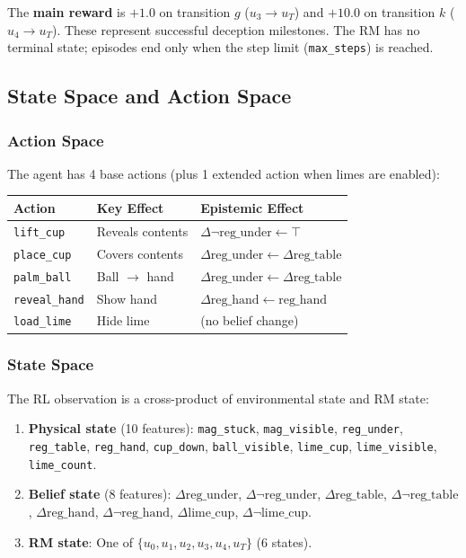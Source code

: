 \documentclass[11pt]{article}
\newcommand{\EBel}[1]{\ensuremath{\Delta #1}} %
\begin{document}
The \textbf{main reward} is $+1.0$ on transition $g$ ($u_3 \to u_T$) and $+10.0$ on transition $k$ ($u_4 \to u_T$). These represent successful deception milestones. The RM has no terminal state; episodes end only when the step limit (\texttt{max\_steps}) is reached.

\subsection{State Space and Action Space}

\subsubsection{Action Space}
The agent has 4 base actions (plus 1 extended action when limes are enabled):

\begin{center}
\begin{tabular}{lll}
\toprule
\textbf{Action} & \textbf{Key Effect} & \textbf{Epistemic Effect} \\
\midrule
\texttt{lift\_cup} & Reveals contents & $\EBel{\neg\text{reg\_under}} \gets \top$ \\
\texttt{place\_cup} & Covers contents & $\EBel{\text{reg\_under}} \gets \EBel{\text{reg\_table}}$ \\
\texttt{palm\_ball} & Ball $\to$ hand & $\EBel{\text{reg\_under}} \gets \EBel{\text{reg\_table}}$ \\
\texttt{reveal\_hand} & Show hand & $\EBel{\text{reg\_hand}} \gets \text{reg\_hand}$ \\
\midrule
\texttt{load\_lime} & Hide lime & (no belief change) \\
\bottomrule
\end{tabular}
\end{center}

\subsubsection{State Space}

The RL observation is a cross-product of environmental state and RM state:

\begin{enumerate}
    \item \textbf{Physical state} (10 features): \texttt{mag\_stuck}, \texttt{mag\_visible}, \texttt{reg\_under}, \texttt{reg\_table}, \texttt{reg\_hand}, \texttt{cup\_down}, \texttt{ball\_visible}, \texttt{lime\_cup}, \texttt{lime\_visible}, \texttt{lime\_count}.
    \item \textbf{Belief state} (8 features): $\EBel{\text{reg\_under}}$, $\EBel{\neg\text{reg\_under}}$, $\EBel{\text{reg\_table}}$, $\EBel{\neg\text{reg\_table}}$, $\EBel{\text{reg\_hand}}$, $\EBel{\neg\text{reg\_hand}}$, $\EBel{\text{lime\_cup}}$, $\EBel{\neg\text{lime\_cup}}$.
    \item \textbf{RM state}: One of $\{u_0, u_1, u_2, u_3, u_4, u_T\}$ (6 states).
\end{enumerate}
\end{document}
